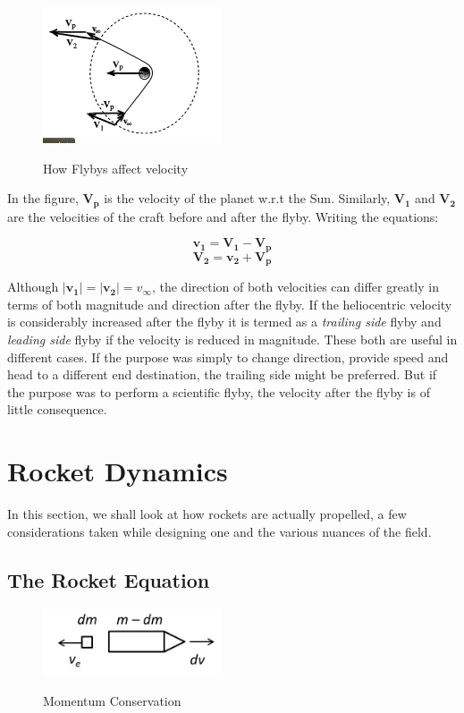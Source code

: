 \documentclass[12pt, letterpaper]{article}
\begin{document}
\begin{figure}[h!]
	\centering
    \includegraphics[width = 200px]{Flyby}
    \label{fig:Flyby}
    \caption{How Flybys affect velocity}
\end{figure}

In the figure, $\mathbf{V_p}$ is the velocity of the planet w.r.t the Sun. Similarly, $\mathbf{V_1}$ and $\mathbf{V_2}$ are the velocities of the craft before and after the flyby. Writing the equations:

\[
	\mathbf{v_1 = V_1  - V_p}
\]
\[
	\mathbf{V_2 = v_2  + V_p}
\]

Although $ |\mathbf{v_1}| = |\mathbf{v_2}|  = v_\infty$, the direction of both velocities can differ greatly in terms of both magnitude and direction after the flyby. If the heliocentric velocity is considerably increased after the flyby it is termed as a \textit{trailing side} flyby and \textit{leading side} flyby if the velocity is reduced in magnitude. These both are useful in different cases. If the purpose was simply to change direction, provide speed and head to a different end destination, the trailing side might be preferred. But if the purpose was to perform a scientific flyby, the velocity after the flyby is of little consequence.

\newpage
\section{Rocket Dynamics}
In this section, we shall look at how rockets are actually propelled, a few considerations taken while designing one and the various nuances of the field. 
\subsection{The Rocket Equation}

\begin{figure}[ht]
	\centering
    \includegraphics[width = 200px]{rocket_thrust}
    \label{fig:rt}
    \caption{Momentum Conservation}
\end{figure}
\end{document}
